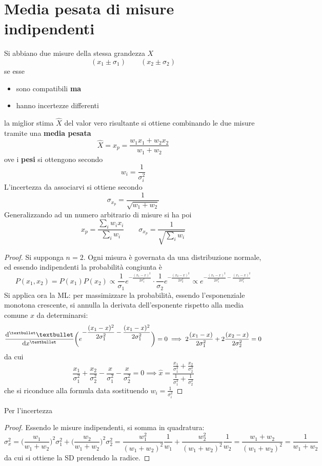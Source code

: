 \documentclass[10pt, oneside]{book}
\begin{document}
\section{Media pesata di misure indipendenti}
Si abbiano due misure della stessa grandezza $X$
\[(x_1 \pm \sigma_1) \qquad (x_2 \pm \sigma_2)\]
se esse
\begin{itemize}
\item sono compatibili \textbf{ma}
\item hanno incertezze differenti
\end{itemize}
la miglior stima $\hat{X}$ del valor vero risultante si ottiene combinando le due misure tramite una \textbf{media pesata}
\[\hat{X} = x_p = \frac{w_1 x_1 + w_2 x_2}{w_1 + w_2}\]
ove i \textbf{pesi} si ottengono secondo
\[w_i = \frac{1}{\sigma_i^2}\]
L'incertezza da associarvi si ottiene secondo
\[\sigma_{x_p} = \frac{1}{\sqrt{w_1 + w_2}}\]
Generalizzando ad un numero arbitrario di misure si ha poi
\[x_p = \frac{\sum_i w_i x_i}{\sum_i w_i} \qquad \sigma_{x_p} = \frac{1}{\sqrt{\sum_i w_i}}\]
\begin{proof}
Si supponga $n=2$. Ogni misura è governata da una distribuzione normale, ed essendo indipendenti la probabilità congiunta è
\[P(x_1, x_2) = P(x_1) P(x_2) \propto \frac{1}{\sigma_1} e^{\displaystyle - \frac{(x_1 - x)^2}{2 \sigma_1^2}} \cdot \frac{1}{\sigma_2} e^{\displaystyle - \frac{(x_2 - x)^2}{2 \sigma_2^2}} \propto e^{\displaystyle - \frac{(x_1 - x)^2}{2 \sigma_1^2}- \frac{(x_1 - x)^2}{2 \sigma_1^2}}\]
Si applica ora la ML: per massimizzare la probabilità, essendo l'esponenziale monotona crescente, si annulla la derivata dell'esponente rispetto alla media comune $x$ da determinarsi:
\[\dv[•]{•}{x} \bigg(e^{\displaystyle - \frac{(x_1 - x)^2}{2 \sigma_1^2}- \frac{(x_1 - x)^2}{2 \sigma_1^2}}\bigg) = 0 \implies 2 \frac{(x_1 - x)}{2 \sigma_1^2} + 2 \frac{(x_2 - x)}{2 \sigma_2^2} = 0\]
da cui
\[\frac{x_1}{\sigma_1^2} + \frac{x_2}{\sigma_2^2} - \frac{x}{\sigma_1^2} - \frac{x}{\sigma_2^2} = 0 \implies \hat{x} = \frac{\displaystyle \frac{x_1}{\sigma_1^2} + \frac{x_2}{\sigma_2^2} }{\displaystyle \frac{1}{\sigma_1^2} + \frac{1}{\sigma_2^2} }\]
che si riconduce alla formula data sostituendo $\displaystyle w_i = \frac{1}{\sigma_i^2}$
\end{proof}
Per l'incertezza
\begin{proof}
Essendo le misure indipendenti, si somma in quadratura:
\[\sigma_x^2 = \bigg(\frac{w_1}{w_1 + w_2}\bigg)^{2} \sigma_1^2 + \bigg(\frac{w_2}{w_1 + w_2}\bigg)^{2} \sigma_2^2 = \frac{w_1^2}{(w_1+w_2)^2}\frac{1}{w_1} + \frac{w_2^2}{(w_1+w_2)^2}\frac{1}{w_2} = \frac{w_1 + w_2}{(w_1 + w_2)^2} = \frac{1}{w_1 + w_2}\]
da cui si ottiene la SD prendendo la radice.
\end{proof}
\end{document}
